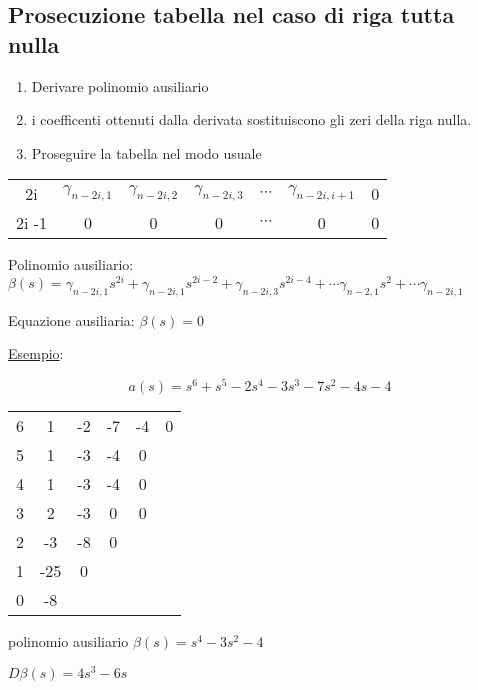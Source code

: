 \documentclass{article}
\begin{document}
\subsection{Prosecuzione tabella nel caso di riga tutta nulla}

\begin{enumerate}
    \item Derivare polinomio ausiliario
    \item i coefficenti ottenuti dalla derivata sostituiscono gli zeri della riga nulla.
    \item Proseguire la tabella nel modo usuale
\end{enumerate}

\begin{center}
\begin{tabular}{c|c c c c c c}
    2i & $\gamma_{n-2i,1}$ & $\gamma_{n-2i,2}$ & $\gamma_{n-2i,3}$  & $\cdots$ & $\gamma_{n-2i,i+1}$  & 0 \\
    2i -1 & 0 & 0 & 0 & $\cdots$ & 0 & 0
\end{tabular}
\end{center}

Polinomio ausiliario:
$ \beta(s) = \gamma_{n-2i,1} s^{2i} + \gamma_{n-2i,1} s^{2i-2} +\gamma_{n-2i,3} s^{2i - 4}  + \cdots \gamma_{n-2,1} s^{2} +  \cdots \gamma_{n-2i,1} $

Equazione ausiliaria: $ \beta(s) = 0$

\underline{Esempio}:

\begin{minipage}{0.45\textwidth}
    \[ a(s) = s^6 + s^5 - 2s^4 -3s^3 - 7s^2 -4s -4 \]
    \begin{center}
        \begin{tabular}{c|c c c c c}
            6 & 1 & -2 & -7 & -4 & 0\\
            5 & 1 & -3 & -4 & 0\\
            4 & 1 & -3 & -4 & 0\\
            \hline
            3 & 2 & -3 & 0 & 0\\
            2 & -3 & -8 & 0\\
            1 & -25 & 0\\
            0 & -8
        \end{tabular}
    \end{center}
\end{minipage}
\begin{minipage}{0.5\textwidth}
    polinomio ausiliario $\beta(s) = s^4 -3s^2 -4$

    $D\beta(s) = 4s^3 - 6s$
\end{minipage}
\end{document}
